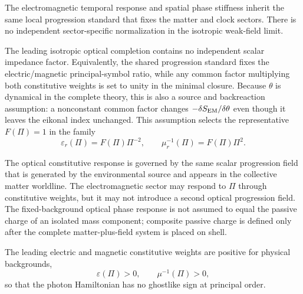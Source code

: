 \documentclass[12pt]{article}
\begin{document}
\begin{assumption}
The electromagnetic temporal response and spatial phase stiffness inherit the same local progression standard that fixes the matter and clock sectors.  There is no independent sector-specific normalization in the isotropic weak-field limit.
\end{assumption}

\begin{assumption}
The leading isotropic optical completion contains no independent scalar impedance factor.  Equivalently, the shared progression standard fixes the electric/magnetic principal-symbol ratio, while any common factor multiplying both constitutive weights is set to unity in the minimal closure.  Because \(\theta\) is dynamical in the complete theory, this is also a source and backreaction assumption: a nonconstant common factor changes \(-\delta S_{\rm EM}/\delta\theta\) even though it leaves the eikonal index unchanged.  This assumption selects the representative \(F(\Pi)=1\) in the family
\begin{equation}
 \varepsilon_r(\Pi)=F(\Pi)\Pi^{-2},\qquad
 \mu_r^{-1}(\Pi)=F(\Pi)\Pi^2 .
\label{eq:impedance_family_assumption}
\end{equation}
\end{assumption}

\begin{assumption}
The optical constitutive response is governed by the same scalar progression field that is generated by the environmental source and appears in the collective matter worldline.  The electromagnetic sector may respond to $\Pi$ through constitutive weights, but it may not introduce a second optical progression field.  The fixed-background optical phase response is not assumed to equal the passive charge of an isolated mass component; composite passive charge is defined only after the complete matter-plus-field system is placed on shell.
\end{assumption}

\begin{assumption}
The leading electric and magnetic constitutive weights are positive for physical backgrounds,
\begin{equation}
 \varepsilon(\Pi)>0,
 \qquad
 \mu^{-1}(\Pi)>0,
\label{eq:positivity}
\end{equation}
so that the photon Hamiltonian has no ghostlike sign at principal order.
\end{assumption}
\end{document}

